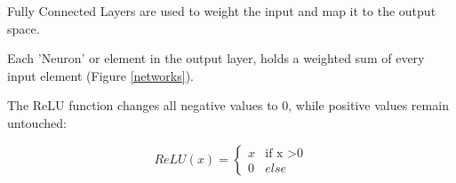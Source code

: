 Fully Connected Layers are used to weight the input and map it to the output space. 

Each 'Neuron' or element in the output layer, holds a weighted sum of every input element (Figure \ref{networks}).

The ReLU function changes all negative values to 0, while positive values remain untouched:

\begin{equation}
ReLU (x) = 
\begin{cases}
x & \text{if x >0} \\
0 & else
\end{cases}
\end{equation}


\pagebreak
